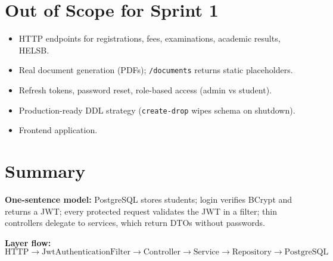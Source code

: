 \documentclass[11pt,a4paper]{article}
\begin{document}
\section{Out of Scope for Sprint 1}

\begin{itemize}
    \item HTTP endpoints for registrations, fees, examinations, academic results, HELSB.
    \item Real document generation (PDFs); \texttt{/documents} returns static placeholders.
    \item Refresh tokens, password reset, role-based access (admin vs student).
    \item Production-ready DDL strategy (\texttt{create-drop} wipes schema on shutdown).
    \item Frontend application.
\end{itemize}

\section{Summary}

\textbf{One-sentence model:} PostgreSQL stores students; login verifies BCrypt and returns a JWT; every protected request validates the JWT in a filter; thin controllers delegate to services, which return DTOs without passwords.

\vspace{1em}
\noindent\textbf{Layer flow:}
\[
\text{HTTP} \rightarrow \text{JwtAuthenticationFilter} \rightarrow \text{Controller}
\rightarrow \text{Service} \rightarrow \text{Repository} \rightarrow \text{PostgreSQL}
\]
\end{document}
